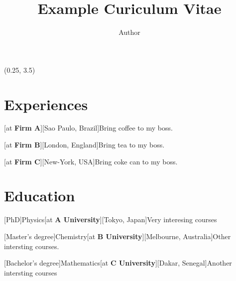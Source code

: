 \documentclass[a4paper]{arthur-cv}
\title{Example Curiculum Vitae}
\author{Author}
\begin{document}
  \makeprofile %

  \begin{textblock}{20.5}(0.25, 3.5)

    \begin{minipage}[t]{0.37\textwidth}







    \end{minipage}\hfill\begin{minipage}[t]{0.61\textwidth}


      \section{Experiences}
        \begin{rightenv}
          [at \textbf{Firm A}][Sao Paulo, Brazil]{Bring coffee to my boss.}

          [at \textbf{Firm B}][London, England]{Bring tea to my boss.}

          [at \textbf{Firm C}][New-York, USA]{Bring coke can to my boss.}
        \end{rightenv}

      \section{Education}
        \begin{rightenv}
          [PhD]{Physics}[at \textbf{A University}][Tokyo, Japan]{Very interesing courses}

          [Master's degree]{Chemistry}[at \textbf{B University}][Melbourne, Australia]{Other intersting courses.}

          [Bachelor's degree]{Mathematics}[at \textbf{C University}][Dakar, Senegal]{Another intersting courses}
        \end{rightenv}


    \end{minipage}

  \end{textblock}
\end{document}
